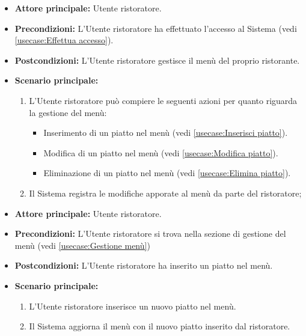 \label{usecase:Gestione menù}
\begin{itemize}
	\item \textbf{Attore principale:} Utente ristoratore.

	\item \textbf{Precondizioni:} L'Utente ristoratore ha effettuato l'accesso al Sistema (vedi \autoref{usecase:Effettua accesso}).

	\item \textbf{Postcondizioni:} L'Utente ristoratore gestisce il menù del proprio ristorante.


	\item \textbf{Scenario principale:}
	      \begin{enumerate}

		      \item L'Utente ristoratore può compiere le seguenti azioni per quanto riguarda la gestione del menù:
		      \begin{itemize}
                \item Inserimento di un piatto nel menù (vedi \autoref{usecase:Inserisci piatto}).
                \item Modifica di un piatto nel menù (vedi \autoref{usecase:Modifica piatto}).
                \item Eliminazione di un piatto nel menù (vedi \autoref{usecase:Elimina piatto}).
              \end{itemize}
		      \item Il Sistema registra le modifiche apporate al menù da parte del ristoratore;

	      \end{enumerate}
\end{itemize}

\label{usecase:Inserisci piatto}
\begin{itemize}

	\item \textbf{Attore principale:} Utente ristoratore.

	\item \textbf{Precondizioni:} L'Utente ristoratore si trova nella sezione di gestione del menù (vedi \autoref{usecase:Gestione menù})

	\item \textbf{Postcondizioni:} L'Utente ristoratore ha inserito un piatto nel menù.

	\item \textbf{Scenario principale:}
	\begin{enumerate}
		\item L'Utente ristoratore inserisce un nuovo piatto nel menù.
		\item Il Sistema aggiorna il menù con il nuovo piatto inserito dal ristoratore.
	\end{enumerate}

\end{itemize}


